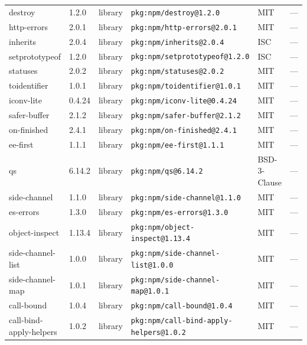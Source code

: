 \documentclass[11pt,a4paper]{article}
\begin{document}
\begin{longtable}{|p{4cm}|p{2cm}|p{1.6cm}|p{5cm}|p{1.5cm}|p{3.5cm}|}
\raggedright destroy & 1.2.0 & library & \small\texttt{pkg:npm/destroy@1.2.0} & MIT & \small — \\
\raggedright http-errors & 2.0.1 & library & \small\texttt{pkg:npm/http-errors@2.0.1} & MIT & \small — \\
\raggedright inherits & 2.0.4 & library & \small\texttt{pkg:npm/inherits@2.0.4} & ISC & \small — \\
\raggedright setprototypeof & 1.2.0 & library & \small\texttt{pkg:npm/setprototypeof@1.2.0} & ISC & \small — \\
\raggedright statuses & 2.0.2 & library & \small\texttt{pkg:npm/statuses@2.0.2} & MIT & \small — \\
\raggedright toidentifier & 1.0.1 & library & \small\texttt{pkg:npm/toidentifier@1.0.1} & MIT & \small — \\
\raggedright iconv-lite & 0.4.24 & library & \small\texttt{pkg:npm/iconv-lite@0.4.24} & MIT & \small — \\
\raggedright safer-buffer & 2.1.2 & library & \small\texttt{pkg:npm/safer-buffer@2.1.2} & MIT & \small — \\
\raggedright on-finished & 2.4.1 & library & \small\texttt{pkg:npm/on-finished@2.4.1} & MIT & \small — \\
\raggedright ee-first & 1.1.1 & library & \small\texttt{pkg:npm/ee-first@1.1.1} & MIT & \small — \\
\raggedright qs & 6.14.2 & library & \small\texttt{pkg:npm/qs@6.14.2} & BSD-3-Clause & \small — \\
\raggedright side-channel & 1.1.0 & library & \small\texttt{pkg:npm/side-channel@1.1.0} & MIT & \small — \\
\raggedright es-errors & 1.3.0 & library & \small\texttt{pkg:npm/es-errors@1.3.0} & MIT & \small — \\
\raggedright object-inspect & 1.13.4 & library & \small\texttt{pkg:npm/object-inspect@1.13.4} & MIT & \small — \\
\raggedright side-channel-list & 1.0.0 & library & \small\texttt{pkg:npm/side-channel-list@1.0.0} & MIT & \small — \\
\raggedright side-channel-map & 1.0.1 & library & \small\texttt{pkg:npm/side-channel-map@1.0.1} & MIT & \small — \\
\raggedright call-bound & 1.0.4 & library & \small\texttt{pkg:npm/call-bound@1.0.4} & MIT & \small — \\
\raggedright call-bind-apply-helpers & 1.0.2 & library & \small\texttt{pkg:npm/call-bind-apply-helpers@1.0.2} & MIT & \small — \\

\end{longtable}
\end{document}
